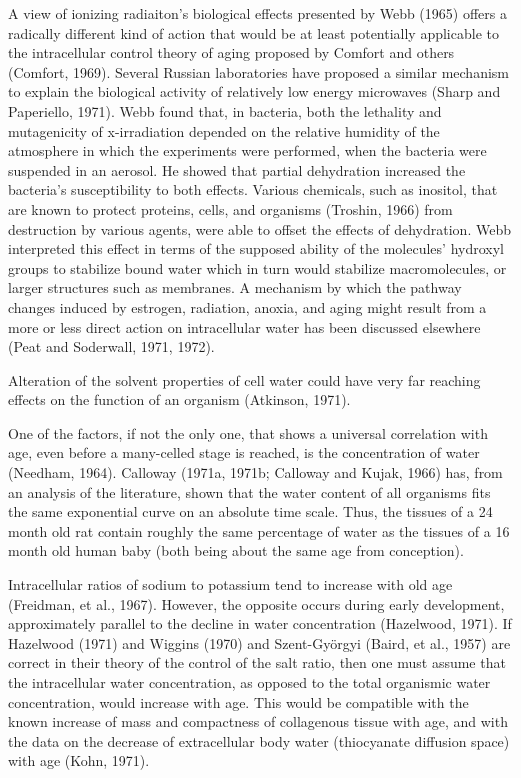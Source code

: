 A view of ionizing radiaiton's biological effects presented by Webb (1965) offers a radically different kind of action that would be at least potentially applicable to the intracellular control theory
of aging proposed by Comfort and others (Comfort, 1969). Several Russian laboratories have proposed a similar mechanism to explain the biological activity of relatively low energy microwaves (Sharp and Paperiello, 1971). Webb
found that, in bacteria, both the lethality and mutagenicity of x-irradiation depended on the relative humidity of the atmosphere in which the experiments were performed, when the
bacteria were suspended in an aerosol. He showed that partial dehydration increased the bacteria's susceptibility to both effects. Various chemicals, such as inositol, that are known to protect proteins, cells, and organisms (Troshin, 1966) from
destruction by various agents, were able to offset the effects of dehydration. Webb interpreted this  effect in terms of the supposed ability of the molecules' hydroxyl groups to stabilize bound water which in turn would
stabilize macromolecules, or larger structures such as membranes. A mechanism by which the pathway changes induced by estrogen, radiation, anoxia, and aging might result from a more or less direct action on intracellular
water has been discussed elsewhere (Peat and Soderwall, 1971, 1972).


Alteration of the solvent properties of cell water could have very far reaching effects on the function of an organism (Atkinson, 1971).

One of the factors, if not the only one, that shows a universal correlation with age, even before a many-celled stage is reached, is the concentration of water (Needham, 1964). Calloway (1971a, 1971b; Calloway and Kujak, 1966) has, from an
analysis of the literature, shown that the water content of all organisms fits the same exponential curve on an absolute time scale. Thus, the tissues of a 24 month old rat contain roughly the same
percentage of water as the tissues of a 16 month old human baby (both being about the same age from conception).

Intracellular ratios of sodium to potassium tend to increase with old age (Freidman, et al., 1967). However, the opposite occurs during early development, approximately parallel to the decline in water concentration (Hazelwood, 1971). If Hazelwood (1971) and
Wiggins (1970) and Szent-Györgyi (Baird, et al., 1957) are correct in their theory of the control of the salt ratio, then one must assume that the intracellular water concentration, as opposed to the total organismic water
concentration, would increase with age. This would be compatible with the known increase of mass and compactness of collagenous tissue with age, and with the data on the decrease of
extracellular body water (thiocyanate diffusion space) with age (Kohn, 1971).

